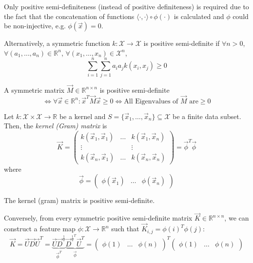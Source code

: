 Only positive semi-definiteness (instead of positive definiteness)
is required due to the fact that the concatenation of
functions $\langle \cdot, \cdot \rangle \circ \phi(\cdot)$
is calculated and $\phi$ could be non-injective,
e.g. $\phi(\vec{x}) = 0$.

Alternatively, a symmetric function $k : \mathcal{X} \to \mathcal{X}$
is positive semi-definite if
$\forall n > 0$,
$\forall (a_1, \dotsc, a_n) \in \mathbb{R}^n$,
$\forall (x_1, \dotsc, x_n) \in \mathcal{X}^n$,
\begin{equation*}
    \sum_{i=1}^n{
        \sum_{j=1}^n{
            a_i a_j k(x_i, x_j)
        }
    }
    \geq 0
\end{equation*}

A symmetric matrix $\vec{M} \in \mathbb{R}^{n \times n}$
is positive semi-definite
\begin{equation*}
    \Leftrightarrow \forall \vec{x} \in \mathbb{R}^n:
        \vec{x}^T \vec{M} \vec{x} \geq 0
    \Leftrightarrow
        \text{All Eigenvalues of $\vec{M}$ are} \geq 0
\end{equation*}

Let $k : \mathcal{X} \times \mathcal{X} \to \mathbb{R}$
be a kernel and $S = \{\vec{x}_1, \dotsc, \vec{x}_n\} \subseteq \mathcal{X}$
be a finite data subset.
Then, the \emph{kernel (Gram) matrix} is
\begin{equation*}
    \vec{K} =
    \begin{pmatrix}
    k(\vec{x}_1, \vec{x}_1) & \dots & k(\vec{x}_1, \vec{x}_n) \\
    \vdots & & \vdots \\
    k(\vec{x}_n, \vec{x}_1) & \dots & k(\vec{x}_n, \vec{x}_n)
    \end{pmatrix}
    = \vec{\phi}^T \vec{\phi}
\end{equation*}
where
\begin{equation*}
    \vec{\phi} =
    \left(
    \begin{array}{c|c|c}
    \phi(\vec{x}_1) & \dots & \phi(\vec{x}_n)
    \end{array}
    \right)
\end{equation*}

The kernel (gram) matrix is positive semi-definite.

Conversely, from every symmetric positive semi-definite
matrix $\vec{K} \in \mathbb{R}^{n \times n}$,
we can construct a feature map
$\phi : \mathcal{X} \to \mathbb{R}^n$ such that
$\vec{K}_{i,j} = \phi(i)^T \phi(j)$:
\begin{equation*}
    \vec{K} = \vec{U}\vec{D}\vec{U}^T
    = \underbrace{\vec{U} \vec{D}^{\frac{1}{2}}}_{\vec{\phi}^T}
    \underbrace{\vec{D}^{\frac{1}{2}^T} \vec{U}^T}_{\vec{\phi}}
    =
    \left(
    \begin{array}{c|c|c}
    \phi(1) & \dots & \phi(n)
    \end{array}
    \right)^T
    \left(
    \begin{array}{c|c|c}
    \phi(1) & \dots & \phi(n)
    \end{array}
    \right)
\end{equation*}

